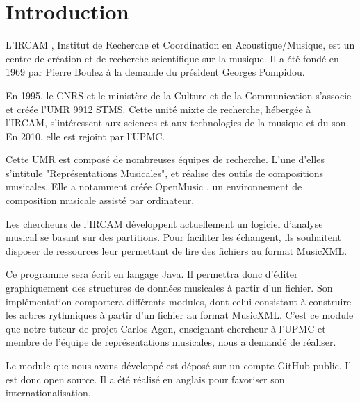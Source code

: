 \section{Introduction}


L'IRCAM \cite{ircam}, Institut de Recherche et Coordination en Acoustique/Musique, est un centre de création et de recherche scientifique sur la musique. Il a été fondé en 1969 par Pierre Boulez à la demande du président Georges Pompidou. 

\par
En 1995, le CNRS et le ministère de la Culture et de la Communication s'associe et créée l'UMR 9912 STMS. Cette unité mixte de recherche, hébergée à l'IRCAM, s'intéressent aux sciences et aux technologies de la musique et du son. En 2010, elle est rejoint par l'UPMC.

\par
Cette UMR est composé de nombreuses équipes de recherche. L'une d'elles s'intitule "Représentations Musicales", et réalise des outils de compositions musicales. Elle a notamment créée OpenMusic \cite{openmusic}, un environnement de composition musicale assisté par ordinateur.

\par
Les chercheurs de l'IRCAM développent actuellement un logiciel d'analyse musical se basant sur des partitions. Pour faciliter les échangent, ils souhaitent disposer de ressources leur permettant de lire des fichiers au format MusicXML. %


\par
Ce programme sera écrit en langage Java. Il permettra donc d'éditer graphiquement des structures de données musicales à partir d'un fichier. Son implémentation comportera différents modules, dont celui consistant à construire les arbres rythmiques à partir d'un fichier au format MusicXML. C'est ce module que notre tuteur de projet Carlos Agon, enseignant-chercheur à l'UPMC et membre de l'équipe de représentations musicales, nous a demandé de réaliser.

\par
Le module que nous avons développé est déposé sur un compte GitHub \cite{github_pstl} public. Il est donc open source. Il a été réalisé en anglais pour favoriser son internationalisation.

